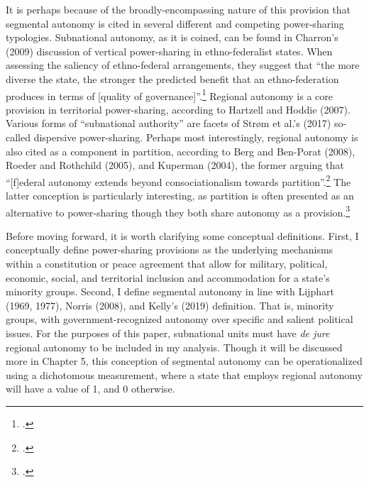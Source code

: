\documentclass[12pt]{article}
\begin{document}
It is perhaps because of the broadly-encompassing nature of this provision that segmental autonomy is cited in several different and competing power-sharing typologies. Subnational autonomy, as it is coined, can be found in Charron’s (2009) discussion of vertical power-sharing in ethno-federalist states. When assessing the saliency of ethno-federal arrangements, they suggest that ``the more diverse the state, the stronger the predicted benefit that an ethno-federation produces in terms of [quality of governance]''.\footcite[600]{charron_government_2009} Regional autonomy is a core provision in territorial power-sharing, according to Hartzell and Hoddie (2007). Various forms of ``subnational authority'' are facets of Strøm et al.’s (2017) so-called dispersive power-sharing. Perhaps most interestingly, regional autonomy is also cited as a component in partition, according to Berg and Ben-Porat (2008), Roeder and Rothchild (2005), and Kuperman (2004), the former arguing that ``[f]ederal autonomy extends beyond consociationalism towards partition''.\footcite[33]{berg_introduction:_2008} The latter conception is particularly interesting, as partition is often presented as an alternative to power-sharing though they both share autonomy as a provision.\footcite{berg_introduction:_2008, roeder_sustainable_2003}

Before moving forward, it is worth clarifying some conceptual definitions. First, I conceptually define power-sharing provisions as the underlying mechanisms within a constitution or peace agreement that allow for military, political, economic, social, and territorial inclusion and accommodation for a state's minority groups. Second, I define segmental autonomy in line with Lijphart (1969, 1977), Norris (2008), and Kelly’s (2019) definition. That is, minority groups, with government-recognized autonomy over specific and salient political issues. For the purposes of this paper, subnational units must have \textit{de jure} regional autonomy to be included in my analysis. Though it will be discussed more in Chapter 5, this conception of segmental autonomy can be operationalized using a dichotomous measurement, where a state that employs regional autonomy will have a value of 1, and 0 otherwise. 
\end{document}
